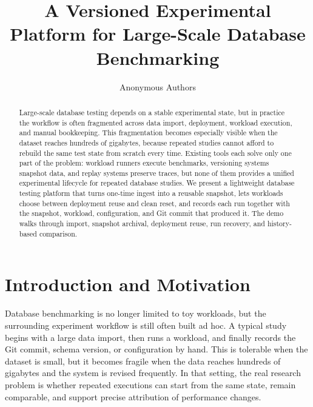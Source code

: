 \documentclass[runningheads]{llncs}
\begin{document}
%
\title{A Versioned Experimental Platform for Large-Scale Database Benchmarking}
%
\author{Anonymous Authors}
%
%
\maketitle
%
\begin{abstract}
Large-scale database testing depends on a stable experimental state, but in practice the workflow is often fragmented across data import, deployment, workload execution, and manual bookkeeping. This fragmentation becomes especially visible when the dataset reaches hundreds of gigabytes, because repeated studies cannot afford to rebuild the same test state from scratch every time. Existing tools each solve only one part of the problem: workload runners execute benchmarks, versioning systems snapshot data, and replay systems preserve traces, but none of them provides a unified experimental lifecycle for repeated database studies. We present a lightweight database testing platform that turns one-time ingest into a reusable snapshot, lets workloads choose between deployment reuse and clean reset, and records each run together with the snapshot, workload, configuration, and Git commit that produced it. The demo walks through import, snapshot archival, deployment reuse, run recovery, and history-based comparison.
\end{abstract}
%
\section{Introduction and Motivation}
Database benchmarking is no longer limited to toy workloads, but the surrounding experiment workflow is still often built ad hoc. A typical study begins with a large data import, then runs a workload, and finally records the Git commit, schema version, or configuration by hand. This is tolerable when the dataset is small, but it becomes fragile when the data reaches hundreds of gigabytes and the system is revised frequently. In that setting, the real research problem is whether repeated executions can start from the same state, remain comparable, and support precise attribution of performance changes.
\end{document}
